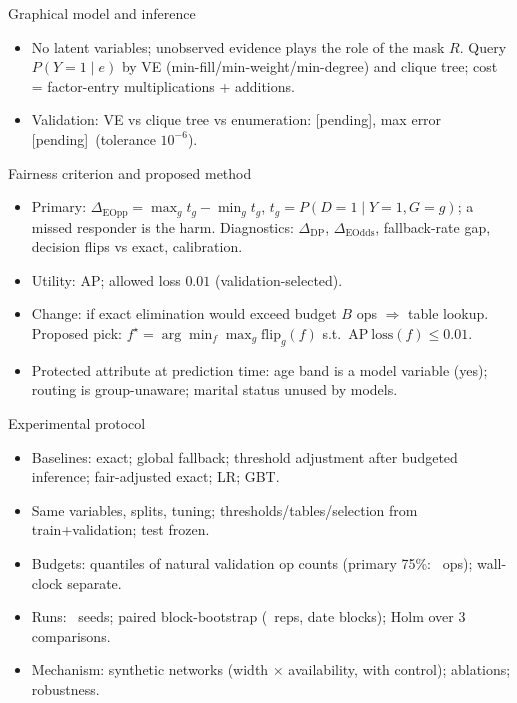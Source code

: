 \documentclass[aspectratio=169,11pt]{beamer}
\newcommand{\resCgm}{[pending]}\newcommand{\resCgmErr}{[pending]}
\begin{document}
\begin{frame}{Graphical model and inference}
\begin{center}\end{center}
\vspace{-3mm}
\begin{itemize}\footnotesize
\item No latent variables; unobserved evidence plays the role of the mask $R$. Query $P(Y{=}1\mid e)$ by VE (min-fill/min-weight/min-degree) and clique tree; cost = factor-entry multiplications + additions.
\item Validation: VE vs clique tree vs enumeration: \resCgm, max error \resCgmErr\ (tolerance $10^{-6}$).
\end{itemize}
\end{frame}

\begin{frame}{Fairness criterion and proposed method}
\begin{itemize}
\item Primary: $\Delta_{\mathrm{EOpp}}=\max_g t_g-\min_g t_g$, $t_g=P(D{=}1\mid Y{=}1,G{=}g)$; a missed responder is the harm. Diagnostics: $\Delta_{\mathrm{DP}}$, $\Delta_{\mathrm{EOdds}}$, fallback-rate gap, decision flips vs exact, calibration.
\item Utility: AP; allowed loss $0.01$ (validation-selected).
\item Change: if exact elimination would exceed budget $B$ ops $\Rightarrow$ table lookup. Proposed pick: $f^\star=\arg\min_f \max_g \mathrm{flip}_g(f)$ s.t.\ $\mathrm{AP\ loss}(f)\le0.01$.
\item Protected attribute at prediction time: age band is a model variable (yes); routing is group-unaware; marital status unused by models.
\end{itemize}
\end{frame}

\begin{frame}{Experimental protocol}
\begin{itemize}
\item Baselines: exact; global fallback; threshold adjustment after budgeted inference; fair-adjusted exact; LR; GBT.
\item Same variables, splits, tuning; thresholds/tables/selection from train+validation; test frozen.
\item Budgets: quantiles of natural validation op counts (primary 75\%: \resBudget\ ops); wall-clock separate.
\item Runs: \resSeeds\ seeds; paired block-bootstrap (\resNboot\ reps, date blocks); Holm over 3 comparisons.
\item Mechanism: synthetic networks (width $\times$ availability, with control); ablations; robustness.
\end{itemize}
\end{frame}
\end{document}
